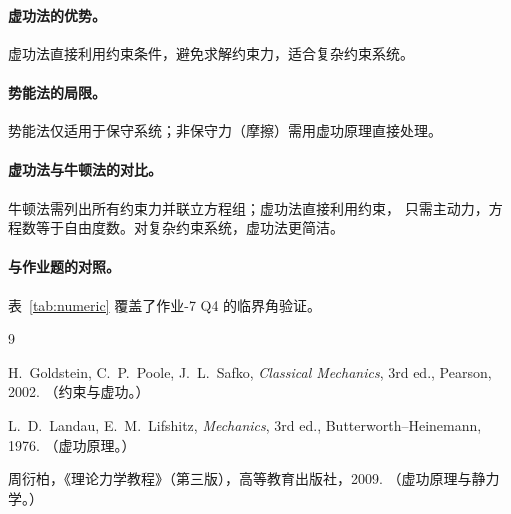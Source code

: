 \documentclass[UTF8,a4paper,11pt]{ctexart}
\begin{document}
\paragraph{虚功法的优势。}
虚功法直接利用约束条件，避免求解约束力，适合复杂约束系统。

\paragraph{势能法的局限。}
势能法仅适用于保守系统；非保守力（摩擦）需用虚功原理直接处理。

\paragraph{虚功法与牛顿法的对比。}
牛顿法需列出所有约束力并联立方程组；虚功法直接利用约束，
只需主动力，方程数等于自由度数。对复杂约束系统，虚功法更简洁。

\paragraph{与作业题的对照。}
表~\ref{tab:numeric} 覆盖了作业-7 Q4 的临界角验证。

\begin{thebibliography}{9}

H.~Goldstein, C.~P.~Poole, J.~L.~Safko,
\emph{Classical Mechanics}, 3rd ed., Pearson, 2002.
（约束与虚功。）

L.~D.~Landau, E.~M.~Lifshitz,
\emph{Mechanics}, 3rd ed., Butterworth--Heinemann, 1976.
（虚功原理。）

周衍柏，《理论力学教程》（第三版），高等教育出版社，2009.
（虚功原理与静力学。）

\end{thebibliography}
\end{document}
